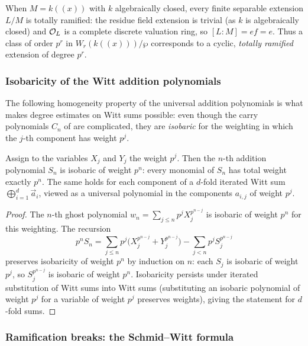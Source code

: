 \begin{rem*}\label{rem:asw_local_totally_ramified:reorg}
When $M = k((x))$ with $k$ algebraically closed, every finite separable extension
$L/M$ is totally ramified: the residue field extension is trivial (as $k$ is
algebraically closed) and $\mathcal{O}_L$ is a complete discrete valuation ring, so
$[L : M] = ef = e$. Thus a class of order $p^r$ in $W_r(k((x)))/\wp$ corresponds to a
cyclic, \emph{totally ramified} extension of degree $p^r$.
\end{rem*}

\subsubsection*{Isobaricity of the Witt addition polynomials}

The following homogeneity property of the universal addition polynomials is what
makes degree estimates on Witt sums possible: even though the carry polynomials $C_n$
of  are complicated, they are \emph{isobaric} for the
weighting in which the $j$-th component has weight $p^j$.

\begin{lemma}\label{lemma:witt_addition_isobaric:reorg}
Assign to the variables $X_j$ and $Y_j$ the weight $p^j$. Then the $n$-th addition
polynomial $S_n$ is isobaric of weight $p^n$: every monomial of $S_n$ has total weight
exactly $p^n$. The same holds for each component of a $d$-fold iterated Witt sum
$\bigoplus_{i=1}^{d} \vec a_i$, viewed as a universal polynomial in the components
$a_{i,j}$ of weight $p^j$.
\end{lemma}

\begin{proof}
The $n$-th ghost polynomial $w_n = \sum_{j \le n} p^j X_j^{p^{n-j}}$ is isobaric of
weight $p^n$ for this weighting. The recursion
\[
p^n S_n = \sum_{j \le n} p^j \bigl(X_j^{p^{n-j}} + Y_j^{p^{n-j}}\bigr)
- \sum_{j < n} p^j S_j^{p^{n-j}}
\]
preserves isobaricity of weight $p^n$ by induction on $n$: each $S_j$ is isobaric of
weight $p^j$, so $S_j^{p^{n-j}}$ is isobaric of weight $p^n$. Isobaricity persists
under iterated substitution of Witt sums into Witt sums (substituting an isobaric
polynomial of weight $p^j$ for a variable of weight $p^j$ preserves weights), giving
the statement for $d$-fold sums.
\end{proof}

\subsubsection*{Ramification breaks: the Schmid--Witt formula}

